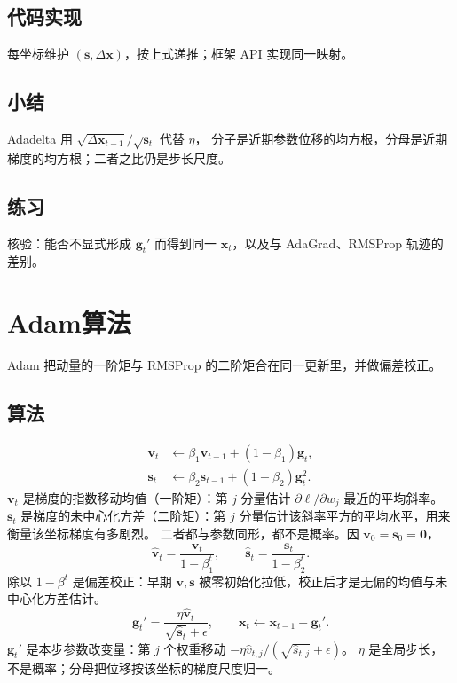 \subsection{代码实现}

每坐标维护 $(\bm{s},\Delta\bm{x})$，按上式递推；框架 API 实现同一映射。

\subsection{小结}

Adadelta 用 $\sqrt{\Delta\bm{x}_{t-1}}/\sqrt{\bm{s}_t}$ 代替 $\eta$，
分子是近期参数位移的均方根，分母是近期梯度的均方根；二者之比仍是步长尺度。

\subsection{练习}

核验：能否不显式形成 $\bm{g}_t'$ 而得到同一 $\bm{x}_t$，以及与 AdaGrad、RMSProp 轨迹的差别。

\section{Adam算法}

Adam 把动量的一阶矩与 RMSProp 的二阶矩合在同一更新里，并做偏差校正。

\subsection{算法}

\begin{align*}
\bm{v}_t&\leftarrow\beta_1\bm{v}_{t-1}+(1-\beta_1)\bm{g}_t,
\\
\bm{s}_t&\leftarrow\beta_2\bm{s}_{t-1}+(1-\beta_2)\bm{g}_t^2.
\end{align*}
$\bm{v}_t$ 是梯度的指数移动均值（一阶矩）：第 $j$ 分量估计 $\partial\ell/\partial w_j$ 最近的平均斜率。
$\bm{s}_t$ 是梯度的未中心化方差（二阶矩）：第 $j$ 分量估计该斜率平方的平均水平，用来衡量该坐标梯度有多剧烈。
二者都与参数同形，都不是概率。因 $\bm{v}_0=\bm{s}_0=\bm{0}$，
\[
\hat{\bm{v}}_t=\frac{\bm{v}_t}{1-\beta_1^t},\qquad
\hat{\bm{s}}_t=\frac{\bm{s}_t}{1-\beta_2^t}.
\]
除以 $1-\beta^t$ 是偏差校正：早期 $\bm{v},\bm{s}$ 被零初始化拉低，校正后才是无偏的均值与未中心化方差估计。
\[
\bm{g}_t'=\frac{\eta\hat{\bm{v}}_t}{\sqrt{\hat{\bm{s}}_t}+\epsilon},
\qquad
\bm{x}_t\leftarrow\bm{x}_{t-1}-\bm{g}_t'.
\]
$\bm{g}_t'$ 是本步参数改变量：第 $j$ 个权重移动 $-\eta\hat v_{t,j}/(\sqrt{\hat s_{t,j}}+\epsilon)$。
$\eta$ 是全局步长，不是概率；分母把位移按该坐标的梯度尺度归一。

